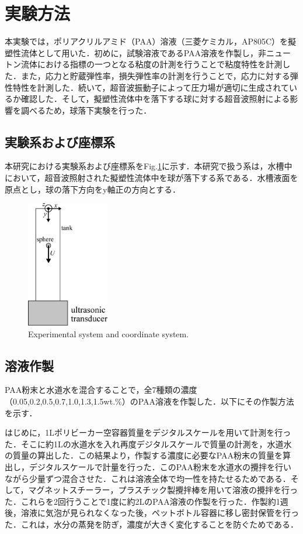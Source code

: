 \section{実験方法}
\label{sec:methods}
本実験では，ポリアクリルアミド（PAA）溶液（三菱ケミカル，AP805C）を擬塑性流体として用いた．初めに，試験溶液であるPAA溶液を作製し，非ニュートン流体における指標の一つとなる粘度の計測を行うことで粘度特性を計測した．また，応力と貯蔵弾性率，損失弾性率の計測を行うことで，応力に対する弾性特性を計測した．続いて，超音波振動子によって圧力場が適切に生成されているか確認した．そして，擬塑性流体中を落下する球に対する超音波照射による影響を調べるため，球落下実験を行った．

\subsection{実験系および座標系}
\label{sec:exp-system}
本研究における実験系および座標系をFig.\ref{fig:system}に示す．本研究で扱う系は，水槽中において，超音波照射された擬塑性流体中を球が落下する系である．水槽液面を原点とし，球の落下方向をy軸正の方向とする．

\begin{figure}[H]
    \centering
    \includegraphics[width=0.32\textwidth]{./2-Methods/device-coordinate.eps}
    \caption{Experimental system and coordinate system.}
    \label{fig:system}
\end{figure}

\subsection{溶液作製}
PAA粉末と水道水を混合することで，全7種類の濃度（0.05,0.2,0.5,0.7,1.0,1.3,1.5wt.\%）のPAA溶液を作製した．以下にその作製方法を示す．

はじめに，1Lポリビーカー空容器質量をデジタルスケールを用いて計測を行った．そこに約1Lの水道水を入れ再度デジタルスケールで質量の計測を，水道水の質量の算出した．この結果より，作製する濃度に必要なPAA粉末の質量を算出し，デジタルスケールで計量を行った．このPAA粉末を水道水の攪拌を行いながら少量ずつ混合させた．これは溶液全体で均一性を持たせるためである．そして，マグネットスチーラー，プラスチック製攪拌棒を用いて溶液の攪拌を行った．これらを2回行うことで1度に約2LのPAA溶液の作製を行った．作製約1週後，溶液に気泡が見られなくなった後，ペットボトル容器に移し密封保管を行った．これは，水分の蒸発を防ぎ，濃度が大きく変化することを防ぐためである．

